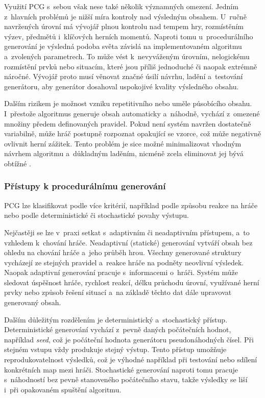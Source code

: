 \documentclass[
   program=itk,
   biblatex,
   figures=true,
   tables=true,
   glossaries,
   index
]{kidiplom}
\begin{document}
Využití PCG s~sebou však nese také několik významných omezení. Jedním z~hlavních problémů je nižší míra kontroly nad výsledným obsahem. U~ručně navržených úrovní má vývojář plnou kontrolu nad tempem hry, rozmístěním výzev, předmětů i~klíčových herních momentů. Naproti tomu u~procedurálního generování je výsledná podoba světa závislá na implementovaném algoritmu a~zvolených parametrech. To může vést k~nevyváženým úrovním, nelogickému rozmístění prvků nebo situacím, které jsou příliš jednoduché či naopak extrémně náročné. Vývojář proto musí věnovat značné úsilí návrhu, ladění a~testování generátoru, aby generátor dosahoval uspokojivé kvality výsledného obsahu.

Dalším rizikem je možnost vzniku repetitivního nebo uměle působícího obsahu. I~přestože algoritmus generuje obsah automaticky a~náhodně, vychází z~omezené množiny předem definovaných pravidel. Pokud není systém navržen dostatečně variabilně, může hráč postupně rozpoznat opakující se vzorce, což může negativně ovlivnit herní zážitek. Tento problém je sice možné minimalizovat vhodným návrhem algoritmu a~důkladným laděním, nicméně zcela eliminovat jej bývá obtížné \cite{Shaker2016}.

\subsubsection{Přístupy k procedurálnímu generování}
PCG lze klasifikovat podle více kritérií, například podle způsobu reakce na hráče nebo podle deterministické či stochastické povahy výstupu.

Nejčastěji se lze v~praxi setkat s~adaptivním či neadaptivním přístupem, a~to vzhledem k~chování hráče. Neadaptivní (statické) generování vytváří obsah bez ohledu na chování hráče a~jeho průběh hrou. Všechny generované struktury vycházejí ze stejných pravidel a~reakce hráče na podněty neovlivní výsledek. Naopak adaptivní generování pracuje s~informacemi o~hráči. Systém může sledovat úspěšnost hráče, rychlost reakcí, délku průchodu úrovní, využívané herní prvky nebo způsob řešení situací a~na základě těchto dat dále upravovat generovaný obsah.

Dalším důležitým rozdělením je deterministický a~stochastický přístup. Deterministické generování vychází z~pevně daných počátečních hodnot, například \textit{seed}, což je počáteční hodnota generátoru pseudonáhodných čísel. Při stejném vstupu vždy produkuje stejný výstup. Tento přístup umožňuje reprodukovatelnost výsledků, což je výhodné například při testování nebo sdílení konkrétních map mezi hráči. Stochastické generování naproti tomu pracuje s~náhodností bez pevně stanoveného počátečního stavu, takže výsledky se liší i~při opakovaném spuštění algoritmu.
\end{document}
